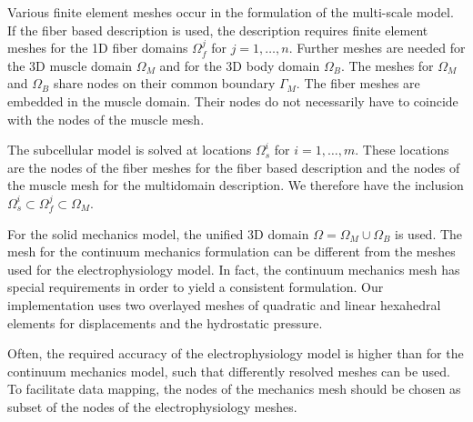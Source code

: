 Various finite element meshes occur in the formulation of the multi-scale model.
If the fiber based description is used, the description requires finite element meshes for the 1D fiber domains $\Omega_f^j$ for ${j=1,\dots,n}$. Further meshes are needed for the 3D muscle domain $\Omega_M$ and for the 3D body domain $\Omega_B$. The meshes for $\Omega_M$ and $\Omega_B$ share nodes on their common boundary $\Gamma_M$. The fiber meshes are embedded in the muscle domain. Their nodes do not necessarily have to coincide with the nodes of the muscle mesh.

The subcellular model is solved at locations $\Omega_s^i$ for $i=1,\dots,m$. These locations are the nodes of the fiber meshes for the fiber based description and the nodes of the muscle mesh for the multidomain description. We therefore have the inclusion $\Omega_s^i \subset \Omega_f^j \subset \Omega_M$.

For the solid mechanics model, the unified 3D domain $\Omega = \Omega_M \cup \Omega_B$ is used. The mesh for the continuum mechanics formulation can be different from the meshes used for the electrophysiology model. In fact, the continuum mechanics mesh has special requirements in order to yield a consistent formulation. Our implementation uses two overlayed meshes of quadratic and linear hexahedral elements for displacements and the hydrostatic pressure. 

Often, the required accuracy of the electrophysiology model is higher than for the continuum mechanics model, such that differently resolved meshes can be used. To facilitate data mapping, the nodes of the mechanics mesh should be chosen as subset of the nodes of the electrophysiology meshes.



